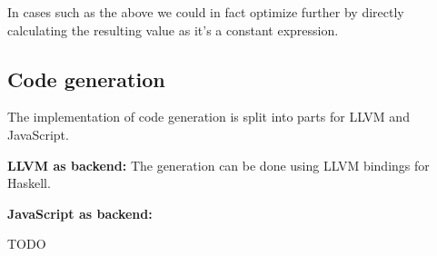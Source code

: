In cases such as the above we could in fact optimize further by directly  calculating the resulting value as it's a constant expression.


\subsection{Code generation}
The implementation of code generation is split into parts for LLVM and JavaScript.

\textbf{LLVM as backend:} The generation can be done using LLVM
bindings for Haskell.

\textbf{JavaScript as backend:}

TODO
